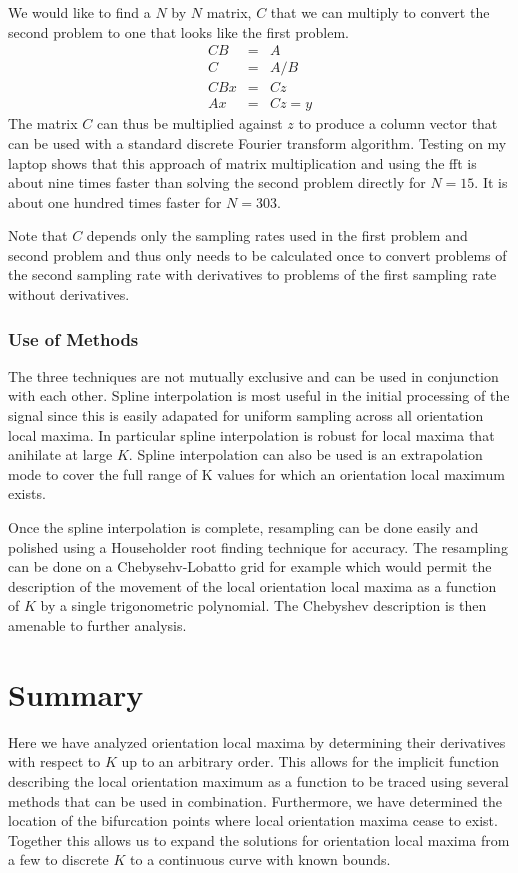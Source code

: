 \documentclass[11pt]{article} %
\begin{document}
We would like to find a $N$ by $N$ matrix, $ C $ that we can multiply to convert the second problem to one that looks like the first problem.
\begin{eqnarray}
C B & = & A \\
C & = & A/B \\
C B x & = & C z \\
A x & = & C z = y
\end{eqnarray}
The matrix $ C $ can thus be multiplied against $ z $ to produce a column vector that can be used with a standard discrete Fourier transform algorithm. Testing on my laptop shows that this approach of matrix multiplication and using the fft is about nine times faster than solving the second problem directly for $ N = 15 $. It is about one hundred times faster for $ N = 303 $.

Note that $ C $ depends only the sampling rates used in the first problem and second problem and thus only needs to be calculated once to convert problems of the second sampling rate with derivatives to problems of the first sampling rate without derivatives.
\subsubsection{Use of Methods}
The three techniques are not mutually exclusive and can be used in conjunction with each other. Spline interpolation is most useful in the initial processing of the signal since this is easily adapated for uniform sampling across all orientation local maxima. In particular spline interpolation is robust for local maxima that anihilate at large $ K $. Spline interpolation can also be used is an extrapolation mode to cover the full range of K values for which an orientation local maximum exists.

Once the spline interpolation is complete, resampling can be done easily and polished using a Householder root finding technique for accuracy. The resampling can be done on a Chebysehv-Lobatto grid for example which would permit the description of the movement of the local orientation local maxima as a function of  $ K $ by a single trigonometric polynomial. The Chebyshev description is then amenable to further analysis.
\section{Summary}
Here we have analyzed orientation local maxima by determining their derivatives with respect to $ K $ up to an arbitrary order. This allows for the implicit function describing the local orientation maximum as a function to be traced using several methods that can be used in combination. Furthermore, we have determined the location of the bifurcation points where local orientation maxima cease to exist. Together this allows us to expand the solutions for orientation local maxima from a few to discrete $ K $ to a continuous curve with known bounds.
\end{document}
